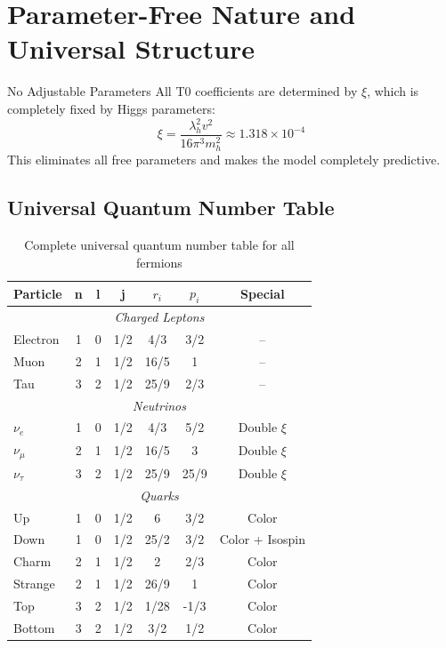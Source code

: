 	\section{Parameter-Free Nature and Universal Structure}
	\label{sec:parameter_free_nature}
	
	\begin{important}{No Adjustable Parameters}{}
		All T0 coefficients are determined by $\xi$, which is completely fixed by Higgs parameters:
		\begin{equation}
			\xi = \frac{\lambda_h^2 v^2}{16\pi^3 m_h^2} \approx 1.318 \times 10^{-4}
		\end{equation}
		This eliminates all free parameters and makes the model completely predictive.
	\end{important}
	
	\subsection{Universal Quantum Number Table}
	\label{subsec:universal_quantum_table}
	
	\begin{table}[H]
		\centering
		\begin{tabular}{lcccccc}
			\toprule
			\textbf{Particle} & \textbf{n} & \textbf{l} & \textbf{j} & \textbf{$r_i$} & \textbf{$p_i$} & \textbf{Special} \\
			\midrule
			\multicolumn{7}{c}{\textit{Charged Leptons}} \\
			\midrule
			Electron & 1 & 0 & 1/2 & 4/3 & 3/2 & -- \\
			Muon & 2 & 1 & 1/2 & 16/5 & 1 & -- \\
			Tau & 3 & 2 & 1/2 & 25/9 & 2/3 & -- \\
			\midrule
			\multicolumn{7}{c}{\textit{Neutrinos}} \\
			\midrule
			$\nu_e$ & 1 & 0 & 1/2 & 4/3 & 5/2 & Double $\xi$ \\
			$\nu_\mu$ & 2 & 1 & 1/2 & 16/5 & 3 & Double $\xi$ \\
			$\nu_\tau$ & 3 & 2 & 1/2 & 25/9 & 25/9 & Double $\xi$ \\
			\midrule
			\multicolumn{7}{c}{\textit{Quarks}} \\
			\midrule
			Up & 1 & 0 & 1/2 & 6 & 3/2 & Color \\
			Down & 1 & 0 & 1/2 & 25/2 & 3/2 & Color + Isospin \\
			Charm & 2 & 1 & 1/2 & 2 & 2/3 & Color \\
			Strange & 2 & 1 & 1/2 & 26/9 & 1 & Color \\
			Top & 3 & 2 & 1/2 & 1/28 & -1/3 & Color \\
			Bottom & 3 & 2 & 1/2 & 3/2 & 1/2 & Color \\
			\bottomrule
		\end{tabular}
		\caption{Complete universal quantum number table for all fermions}
		\label{tab:universal_quantum_numbers}
	\end{table}

